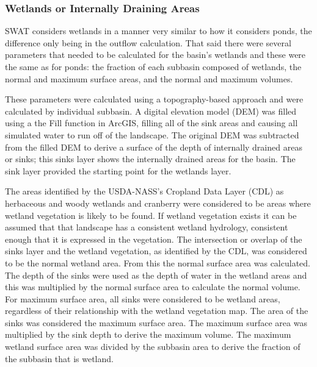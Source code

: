 \subsubsection{Wetlands or Internally Draining Areas}\label{sec:wetlands}

	SWAT considers wetlands in a manner very similar to how it considers ponds, the difference only being in the outflow calculation. That said there were several parameters that needed to be calculated for the basin's wetlands and these were the same as for ponds: the fraction of each subbasin composed of wetlands, the normal and maximum surface areas, and the normal and maximum volumes. 
	
	These parameters were calculated using a topography-based approach and were calculated by individual subbasin. A digital elevation model (DEM) was filled using a the Fill function in ArcGIS, filling all of the sink areas and causing all simulated water to run off of the landscape. The original DEM was subtracted from the filled DEM to derive a surface of the depth of internally drained areas or sinks; this sinks layer shows the internally drained areas for the basin. The sink layer provided the starting point for the wetlands layer. 
	
	The areas identified by the USDA-NASS's Cropland Data Layer (CDL) as herbaceous and woody wetlands and cranberry were considered to be areas where wetland vegetation is likely to be found. If wetland vegetation exists it can be assumed that that landscape has a consistent wetland hydrology, consistent enough that it is expressed in the vegetation. The intersection or overlap of the sinks layer and the wetland vegetation, as identified by the CDL, was considered to be the normal wetland area. From this the normal surface area was calculated. The depth of the sinks were used as the depth of water in the wetland areas and this was multiplied by the normal surface area to calculate the normal volume. For maximum surface area, all sinks were considered to be wetland areas, regardless of their relationship with the wetland vegetation map. The area of the sinks was considered the maximum surface area. The maximum surface area was multiplied by the sink depth to derive the maximum volume. The maximum wetland surface area was divided by the subbasin area to derive the fraction of the subbasin that is wetland.
	
